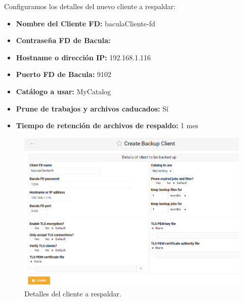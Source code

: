 Configuramos los detalles del nuevo cliente a respaldar:





\begin{minipage}[t]{0.45\textwidth}
    \vspace{0pt} %
    \begin{itemize}
        \item \textbf{Nombre del Cliente FD:} baculaCliente-fd
        \item \textbf{Contraseña FD de Bacula:} 
        \item \textbf{Hostname o dirección IP:} 192.168.1.116
        \item \textbf{Puerto FD de Bacula:} 9102
        \item \textbf{Catálogo a usar:} MyCatalog
        \item \textbf{Prune de trabajos y archivos caducados:} Sí
        \item \textbf{Tiempo de retención de archivos de respaldo:} 1 mes
    \end{itemize}

    \end{minipage}%
    \hfill %
    \begin{minipage}[t]{0.45\textwidth}
    \vspace{0pt} %
    \centering %
      
    

    
\begin{figure}[H]
    \centering
    \includegraphics[width=0.95\linewidth]{instalacionBacula/detalesclienteparabuckup.png}
    \caption{Detalles del cliente a respaldar.}
\end{figure}
    \end{minipage}


